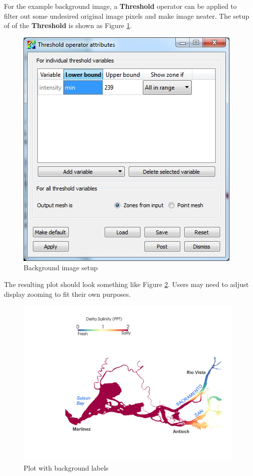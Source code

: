 \documentclass[12pt]{report}
\begin{document}
For the example background image, a {\bf Threshold} operator can be applied to filter out some undesired original image pixels and make image neater.  The setup of of the {\bf Threshold} is shown as Figure \ref{figure:backgroundThreshold}.
				
				\begin{figure}
        \begin{center}
        \includegraphics[scale=0.75]{backgroundThreshold}
        \caption{Background image setup}
        \label{figure:backgroundThreshold}
        \end{center}
        \end{figure}
				
The resulting plot should look something like Figure \ref{figure:saltWithBackground}. Users may need to adjust display zooming to fit their own purposes.
				
				\begin{figure}
        \begin{center}
        \includegraphics[scale=0.15]{saltWithBackground}
        \caption{Plot with background labels}
        \label{figure:saltWithBackground}
        \end{center}
        \end{figure}
				
\end{document}
